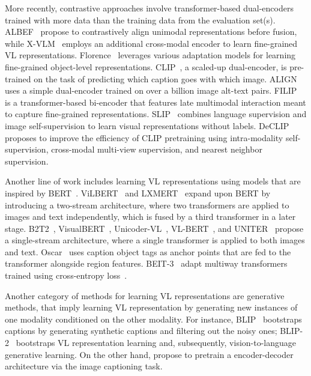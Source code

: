 More recently, contrastive approaches involve transformer-based dual-encoders trained with more data than the training data from the evaluation set(s).
ALBEF~\citep{li2021align} propose to contrastively align unimodal representations before fusion, while X-VLM~\citep{zeng2022multi} employs an additional cross-modal encoder to learn fine-grained \ac{VL} representations.
Florence~\citep{yuan2021florence} leverages various adaptation models for learning fine-grained object-level representations.
CLIP~\citep{radford2021learning}, a scaled-up dual-encoder, is pre-trained on the task of predicting which caption goes with which image.
ALIGN~\citep{jia2021scaling} uses a simple dual-encoder trained on over a billion image alt-text pairs.
FILIP~\citep{yao2022flip} is a transformer-based bi-encoder that features late multimodal interaction meant to capture fine-grained representations.
SLIP~\citep{mu2022slip} combines language supervision and image self-supervision to learn visual representations without labels.
DeCLIP~\citep{li2022supervision} proposes to improve the efficiency of CLIP pretraining using intra-modality self-supervision, cross-modal multi-view supervision, and nearest neighbor supervision.

Another line of work includes learning \ac{VL} representations using models that are inspired by BERT~\citep{devlin2019_bert}.
ViLBERT~\citep{lu2019vilbert} and LXMERT~\citep{tan2019lxmert} expand upon BERT by introducing a two-stream architecture, where two transformers are applied to images and text independently, which is fused by a third transformer in a later stage. 
B2T2~\citep{alberti2019fusion}, VisualBERT~\citep{li2019visualbert}, Unicoder-VL~\citep{li2019unicoder}, VL-BERT~\citep{su2019vl}, and UNITER~\citep{chen2020uniter} propose a single-stream architecture, where a single transformer is applied to both images and text.
Oscar~\citep{li2020oscar} uses caption object tags as anchor points that are fed to the transformer alongside region features.
BEIT-3~\citep{wang2022image} adapt multiway transformers trained using cross-entropy loss~\citep{bao2022vlmo}.

Another category of methods for learning \ac{VL} representations are generative methods, that imply learning \ac{VL} representation by generating new instances of one modality conditioned on the other modality. For instance, BLIP~\citep{li2022blip} bootstraps captions by generating synthetic captions and filtering out the noisy ones; BLIP-2~\citep{li2023blip} bootstraps \ac{VL} representation learning and, subsequently, vision-to-language generative learning.
On the other hand, \citet{tschannen2023image} propose to pretrain a encoder-decoder architecture via the image captioning task.

